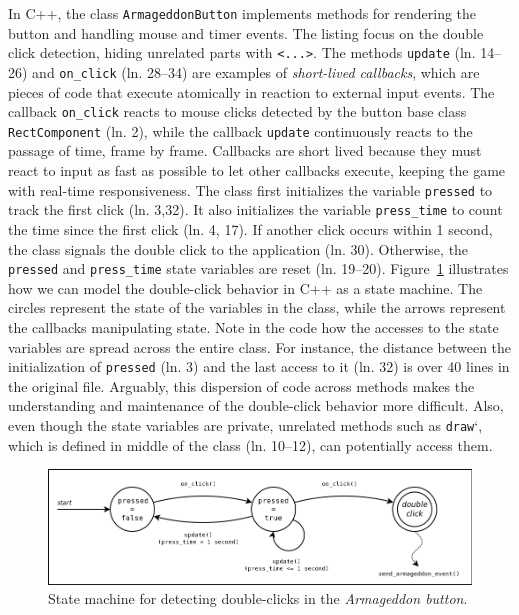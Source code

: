 \documentclass{vgtc}                          %
\newcommand{\code}[1] {{\small{\texttt{#1}}}}
\begin{document}
In C++, the class \code{ArmageddonButton} implements methods for rendering the
button and handling mouse and timer events.
The listing focus on the double click detection, hiding unrelated parts with
\code{<...>}.
%
The methods \code{update} (ln. 14--26) and \code{on\_click} (ln. 28--34) are
examples of \emph{short-lived callbacks}, which are pieces of code that execute
atomically in reaction to external input events.
The callback \code{on\_click} reacts to mouse clicks detected by the button
base class \code{RectComponent} (ln. 2), while the callback \code{update}
continuously reacts to the passage of time, frame by frame.
Callbacks are short lived because they must react to input as fast as possible
to let other callbacks execute, keeping the game with real-time responsiveness.
%
The class first initializes the variable \code{pressed} to track the first
click (ln. 3,32).
It also initializes the variable \code{press\_time} to count the time since the
first click (ln. 4, 17).
If another click occurs within 1 second, the class signals the double click to
the application (ln. 30).
Otherwise, the \code{pressed} and \code{press\_time} state variables are reset
(ln. 19--20). 
%
Figure~\ref{fig.armageddon.fsm} illustrates how we can model the double-click 
behavior in C++ as a state machine.
The circles represent the state of the variables in the class, while the arrows 
represent the callbacks manipulating state.
%
Note in the code how the accesses to the state variables are spread
across the entire class.
For instance, the distance between the initialization of \code{pressed} (ln.
3) and the last access to it (ln. 32) is over 40 lines in the original file.
Arguably, this dispersion of code across methods makes the understanding and 
maintenance of the double-click behavior more difficult.
Also, even though the state variables are private, unrelated methods such as 
\code{draw}`, which is defined in middle of the class (ln. 10--12), can
potentially access them.

\begin{figure}[t]
\centering
\includegraphics[width=\columnwidth]{double-click}
\caption{State machine for detecting double-clicks in the
         \emph{Armageddon button}.
\label{fig.armageddon.fsm}
}
\end{figure}
\end{document}
